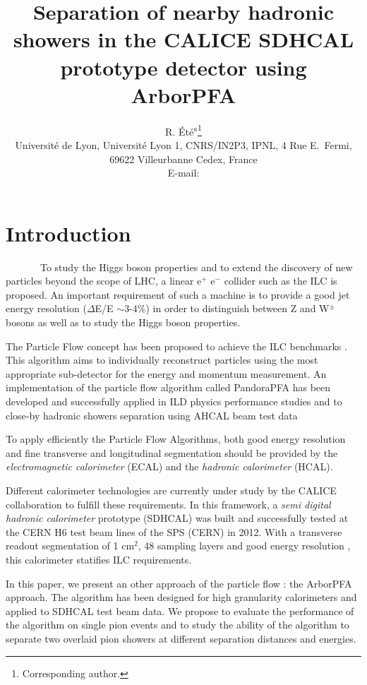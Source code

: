 \documentclass[cits]{JINST}
\title{Separation of nearby hadronic showers in the CALICE SDHCAL prototype detector using ArborPFA}
\author{R. \'Et\'e$^a$\thanks{Corresponding author.} \\%
\llap{$^a$} Universit\'e de Lyon, Universit\'e Lyon 1, CNRS/IN2P3, 
 IPNL, 4 Rue E.~Fermi, 69622 Villeurbanne Cedex, France\\
 
 
 E-mail: \email{rete@ipnl.in2p3.fr}
 }
\begin{document}

\newpage
\section{Introduction}

~~~~~~~To study the Higgs boson properties and to extend the discovery of new particles beyond the scope of LHC, a linear e$^+$ e$^-$ collider such as the ILC is proposed. An important requirement of such a machine is to provide a good jet energy resolution ($\Delta$E/E $\sim$3-4\%) in order to distinguish between Z and W$^{\pm}$ bosons as well as to study the Higgs boson properties. 

The Particle Flow concept has been proposed to achieve the ILC benchmarks \cite{ilc-tdr}. This algorithm aims to individually reconstruct particles using the most appropriate sub-detector for the energy and momentum measurement. An implementation of the particle flow algorithm called PandoraPFA has been developed \cite{pandora-pfa} and successfully applied in ILD physics performance studies and to close-by hadronic showers separation using AHCAL beam test data %

To apply efficiently the Particle Flow Algorithms, both good energy resolution and fine transverse and longitudinal segmentation should be provided by the \textit{electromagnetic calorimeter} (ECAL) and the \textit{hadronic calorimeter} (HCAL).

Different calorimeter technologies are currently under study by the CALICE collaboration to fulfill these requirements. In this framework, a \textit{semi digital hadronic calorimeter} prototype (SDHCAL) was built \cite{sdhcal-paper} and successfully tested at the CERN H6 test beam lines of the SPS (CERN) in 2012. With a transverse readout segmentation of 1 cm$^2$, 48 sampling layers and good energy resolution \cite{sdhcal-paper}, this calorimeter statifies ILC requirements. 

In this paper, we present an other approach of the particle flow : the ArborPFA approach. The algorithm has been designed for high granularity calorimeters and applied to SDHCAL test beam data. We propose to evaluate the performance of the algorithm on single pion events and to study the ability of the algorithm to separate two overlaid pion showers at different separation distances and energies.
\end{document}
